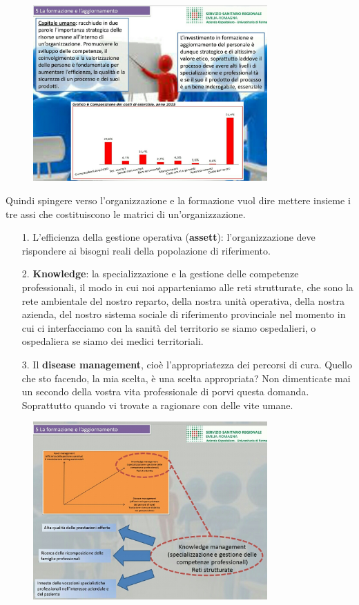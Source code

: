  \begin{figure}[!ht]
\centering
	\includegraphics[width=0.8\textwidth]{32/image20.jpeg}
	\end{figure}

Quindi spingere verso l'organizzazione e la formazione vuol dire mettere
insieme i tre assi che costituiscono le matrici di un'organizzazione.

\begin{itemize}
\item[1.]
  L'efficienza della gestione operativa (\textbf{assett}):
  l'organizzazione deve rispondere ai bisogni reali della popolazione di
  riferimento.
\item[2.]
  \textbf{Knowledge}: la specializzazione e la gestione delle competenze
  professionali, il modo in cui noi apparteniamo alle reti strutturate,
  che sono la rete ambientale del nostro reparto, della nostra unità
  operativa, della nostra azienda, del nostro sistema sociale di
  riferimento provinciale nel momento in cui ci interfacciamo con la
  sanità del territorio se siamo ospedalieri, o ospedaliera se siamo dei
  medici territoriali.
\item[3.]
  Il \textbf{disease management}, cioè l'appropriatezza dei percorsi di
  cura. Quello che sto facendo, la mia scelta, è una scelta appropriata?
  Non dimenticate mai un secondo della vostra vita professionale di
  porvi questa domanda. Soprattutto quando vi trovate a ragionare con
  delle vite umane.
\end{itemize}

 \begin{figure}[!ht]
\centering
	\includegraphics[width=0.8\textwidth]{32/image21.jpeg}
	\end{figure}

